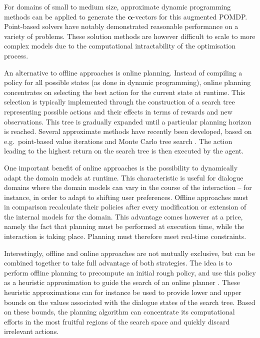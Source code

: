 For domains of small to medium size, approximate dynamic programming methods can be applied to generate the $\boldsymbol\alpha$-vectors for this augmented POMDP.  Point-based solvers \citep{Pineau:2004,Porta:2006} have notably demonstrated reasonable performance on a variety of problems. These solution methods are however difficult to scale to more complex models due to the computational intractability of the optimisation process.    

An alternative to offline approaches is online planning.  Instead of compiling a policy for all possible states (as done in dynamic programming), online planning concentrates on selecting the best action for the current state at runtime. This selection is typically implemented through the construction of a search tree representing possible actions and their effects in terms of rewards and new observations. This tree is gradually expanded until a particular planning horizon is reached.  Several approximate methods have recently been developed, based on e.g.\ point-based value iterations \citep{ross2008} and Monte Carlo tree search \citep{silver2010uct}. The action leading to the highest return on the search tree is then executed by the agent.  

One important benefit of online approaches is the possibility to dynamically adapt the domain models at runtime. This characteristic is useful for dialogue domains where the domain models can vary in the course of the interaction -- for instance, in order to adapt to shifting user preferences. Offline approaches must in comparison recalculate their policies after every modification or extension of the internal models for the domain.   This advantage comes however at a price, namely the fact that planning must be performed at execution time, while the interaction is taking place.  Planning must therefore meet real-time constraints. 

Interestingly, offline and online approaches are not mutually exclusive, but can be combined together to take full advantage of both strategies.  The idea is to perform offline planning to precompute an initial rough policy, and use this policy as a heuristic approximation to guide the search of an online planner \citep{RossC07}. These heuristic approximations can for instance be used to provide lower and upper bounds on the values associated with the dialogue states of the search tree.  Based on these bounds, the planning algorithm can concentrate its computational efforts in the most fruitful regions of the search space and quickly discard irrelevant actions. 

